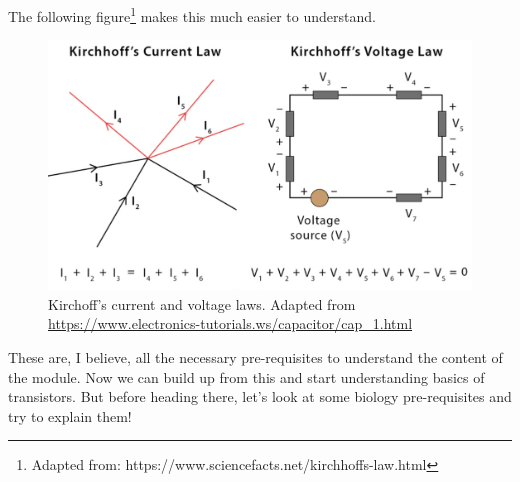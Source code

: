 The following figure\footnote{Adapted from: https://www.sciencefacts.net/kirchhoffs-law.html} makes this much easier to understand.  

\begin{figure}[H]
    \centering
    \includegraphics[width=0.7\linewidth]{../../Figures/Kirchoff.PNG}
    \caption{Kirchoff's current and voltage laws. Adapted from \url{https://www.electronics-tutorials.ws/capacitor/cap_1.html}}
    \label{fig:Capacitors}
\end{figure}

These are, I believe, all the necessary pre-requisites to understand the content of the module. Now we can build up from this and start understanding basics of transistors. But before heading there, let's look at some biology pre-requisites and try to explain them!


